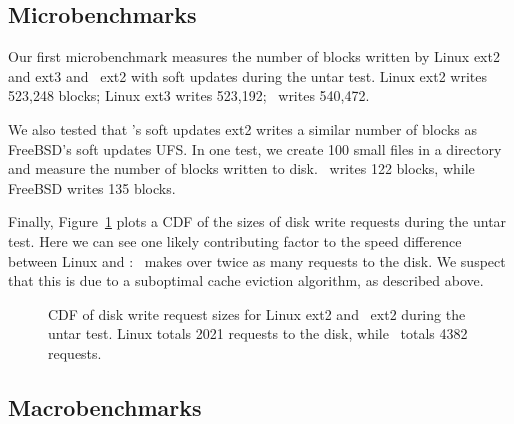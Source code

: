 \begin{comment}
\begin{figure}[t]
\vspace{-0.5\baselineskip}
\centering{
\texttt{[image: rb\_chdesc\_size]}
}
\vspace{-0.5\baselineskip}
\caption{\label{fig:patchsize-histo} \Rb\ \chdesc\ size histogram for a sample
workload (extracting a large archive into ext2). All the \chdescs\ larger than
63 bytes have been optimized into \nrb\ \chdescs. \Rb\ \chdescs\ 4 bytes and
smaller account for about 51\% of all \rb\ \chdescs.}
\end{figure}
\end{comment}

\subsection {Microbenchmarks}
Our first microbenchmark measures the number of blocks written by Linux ext2
and ext3 and \Kudos\ ext2 with soft updates during the untar test. Linux ext2
writes 523,248 blocks; Linux ext3 writes 523,192; \Kudos\ writes 540,472.

We also tested that \Kudos's soft updates ext2 writes a similar number of blocks as FreeBSD's
soft updates UFS. In one test, we create 100 small files in a directory and
measure the number of blocks written to disk. \Kudos\ writes 122 blocks,
while FreeBSD writes 135 blocks.

Finally, Figure~\ref{fig:mergereq-cdf} plots a CDF of the sizes of disk
write requests during the untar test. Here we can see one likely contributing
factor to the speed difference between Linux and \Kudos: \Kudos\ makes over
twice as many requests to the disk. We suspect that this is due to a suboptimal
cache eviction algorithm, as described above.

\begin{figure}[t]
\vspace{-0.5\baselineskip}
\vspace{-0.5\baselineskip}
\caption{\label{fig:mergereq-cdf} CDF of disk write request sizes for
  Linux ext2 and \Kudos\ ext2 during the untar test. Linux totals 2021
  requests to the disk, while \Kudos\ totals 4382 requests.}
\end{figure}

\subsection {Macrobenchmarks}
\label{sec:eval:macro}

